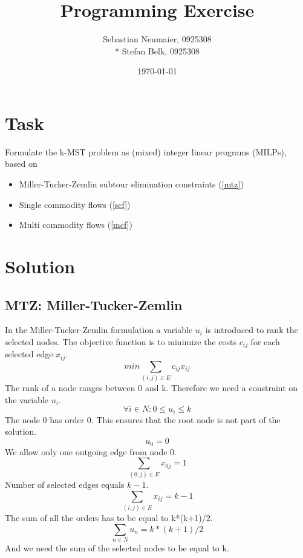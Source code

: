 \documentclass{article}
\title{Programming Exercise}
\author{Sebastian Neumaier, 0925308 \\* Stefan Belk, 0925308}
\date{\today}
\begin{document}
\maketitle

\section{Task}

Formulate the k-MST problem as (mixed) integer linear programs (MILPs), based on
\begin{itemize}
\item Miller-Tucker-Zemlin subtour elimination constraints (\ref{mtz})
\item Single commodity flows (\ref{scf})
\item Multi commodity flows (\ref{mcf})
\end{itemize}
\section{Solution}

\subsection{MTZ: Miller-Tucker-Zemlin \label{mtz}}
In the Miller-Tucker-Zemlin formulation a variable $u_i$ is introduced to rank the selected nodes. The objective function is to minimize the costs $c_{ij}$ for each selected edge $x_{ij}$.
\setcounter{equation}{0}
\begin{equation}
min \sum_{(i,j) \in E} c_{ij} x_{ij}
\end{equation}
The rank of a node ranges between 0 and k. Therefore we need a constraint on the variable $u_i$.
\begin{equation}
\forall i \in N : 0 \le u_i \le k
\end{equation}
The node 0 has order 0. This ensures that the root node is not part of the solution.
\begin{equation}
u_0 = 0
\end{equation}
We allow only one outgoing edge from node 0.
\begin{equation}
\sum_{(0,j) \in E} x_{0j} = 1
\end{equation}
Number of selected edges equals $k-1$.
\begin{equation}
\sum_{(i,j) \in E} x_{ij} = k - 1
\end{equation}
The sum of all the orders has to be equal to k*(k+1)/2.
\begin{equation}
\sum_{n \in N} u_n = k*(k+1)/2
\end{equation}
And we need the sum of the selected nodes to be equal to k.
\begin{equation}

\end{equation}
\end{document}
